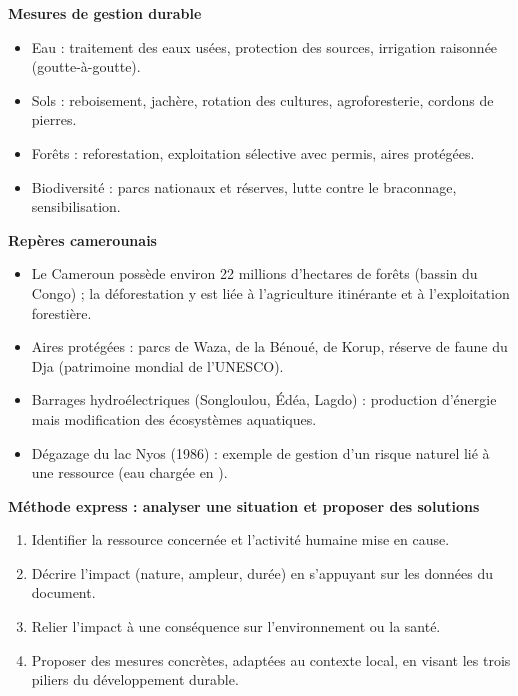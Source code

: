 \documentclass[11pt]{article}
\begin{document}
\begin{bilan}
\textbf{Mesures de gestion durable}
\begin{itemize}
  \item Eau : traitement des eaux usées, protection des sources, irrigation raisonnée (goutte-à-goutte).
  \item Sols : reboisement, jachère, rotation des cultures, agroforesterie, cordons de pierres.
  \item Forêts : reforestation, exploitation sélective avec permis, aires protégées.
  \item Biodiversité : parcs nationaux et réserves, lutte contre le braconnage, sensibilisation.
\end{itemize}

\textbf{Repères camerounais}
\begin{itemize}
  \item Le Cameroun possède environ \num{22} millions d'hectares de forêts (bassin du Congo) ; la déforestation y est liée à l'agriculture itinérante et à l'exploitation forestière.
  \item Aires protégées : parcs de Waza, de la Bénoué, de Korup, réserve de faune du Dja (patrimoine mondial de l'UNESCO).
  \item Barrages hydroélectriques (Songloulou, Édéa, Lagdo) : production d'énergie mais modification des écosystèmes aquatiques.
  \item Dégazage du lac Nyos (1986) : exemple de gestion d'un risque naturel lié à une ressource (eau chargée en ).
\end{itemize}

\textbf{Méthode express : analyser une situation et proposer des solutions}
\begin{enumerate}
  \item Identifier la ressource concernée et l'activité humaine mise en cause.
  \item Décrire l'impact (nature, ampleur, durée) en s'appuyant sur les données du document.
  \item Relier l'impact à une conséquence sur l'environnement ou la santé.
  \item Proposer des mesures concrètes, adaptées au contexte local, en visant les trois piliers du développement durable.
\end{enumerate}
\end{bilan}
\end{document}
